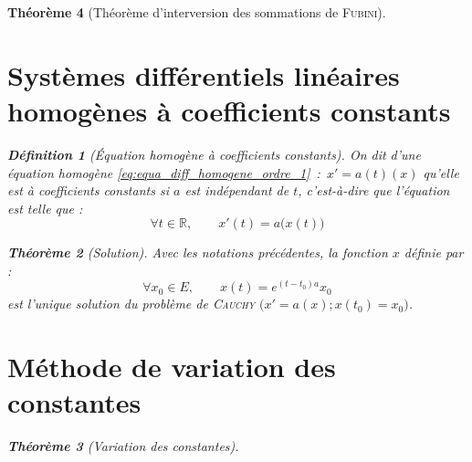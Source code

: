 \documentclass[11pt,a4paper]{report}
\newtheorem{theorem}{Théorème}[chapter]
\newtheorem{itheorem}[theorem]{Théorème}
\theoremstyle{definition}
\newtheorem{dfn}[theorem]{Définition}
\begin{document}
\begin{theorem}[Théorème d'interversion des sommations de \textsc{Fubini}]
{{\section{Systèmes différentiels linéaires homogènes à coefficients constants} %
\label{sec:systemes_differentiels_lineaires_homogenes_coefficients_constants}
\begin{dfn}[Équation homogène à coefficients constants]
    On dit d'une équation homogène \eqref{eq:equa_diff_homogene_ordre_1}~:~$x' = a(t)(x)$ qu'elle est à \emph{coefficients constants} si $a$ est indépendant de $t$, c'est-à-dire que l'équation est telle que : 
    \begin{equation}
    \forall t\in \ensuremath{\mathbb{R}},\qquad x'(t) = a\big( x (t) \big)
    \end{equation}
\end{dfn}
\begin{theorem}[Solution]
     Avec les notations précédentes, la fonction $x$ définie par : 
     \begin{equation}
     \forall x_0\in E,\qquad x(t) = e^{(t-t_0) a} x_0
     \end{equation}
     est l'unique solution du problème de \textsc{Cauchy} $\Big( x' = a(x) ;x(t_0) = x_0 \Big)$.
\end{theorem}

\section{Méthode de variation des constantes} %
\label{sec:methode_de_variation_des_constantes}
\begin{itheorem}[Variation des constantes]
    

\end{itheorem}}}
\end{theorem}
\end{document}
